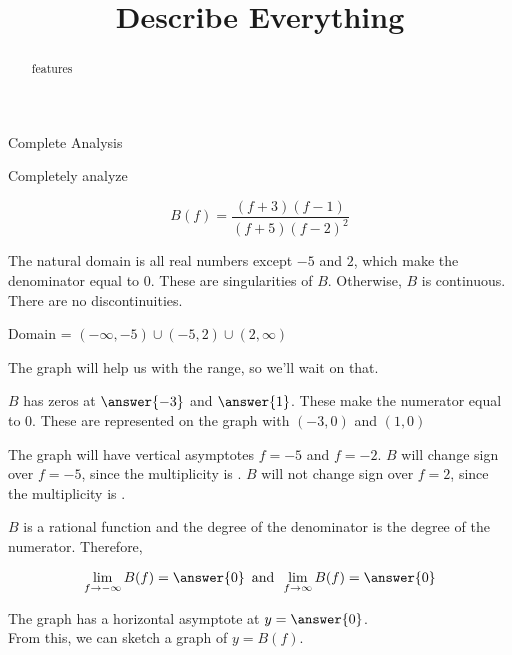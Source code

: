 \documentclass{ximera}
\title{Describe Everything}
\begin{document}
\begin{abstract}
features
\end{abstract}
\maketitle





\begin{example}  Complete Analysis


Completely analyze   

\[   B(f) = \frac{(f+3)(f-1)}{(f+5)(f-2)^2}        \]


\begin{explanation}



The natural domain is all real numbers except $-5$ and $2$, which make the denominator equal to $0$. These are singularities of $B$.  Otherwise, $B$ is continuous.  There are no discontinuities.

Domain = $(-\infty, -5) \cup (-5, 2) \cup (2, \infty)$

The graph will help us with the range, so we'll wait on that.

$B$ has zeros at $\answer{-3}$ and $\answer{1}$.  These make the numerator equal to $0$. These are represented on the graph with $(-3,0)$ and $(1,0)$

The graph will have vertical asymptotes $f=-5$ and $f=-2$.  $B$ will change sign over $f=-5$, since the multiplicity is  .  $B$ will not change sign over $f=2$, since the multiplicity is .

$B$ is a rational function and the degree of the denominator is  the degree of the numerator. Therefore, 


\[ \lim_{f \to -\infty} B(f) = \answer{0}   \, \text{ and }  \,  \lim_{f \to \infty} B(f) = \answer{0}    \]


The graph has a horizontal asymptote at $y=\answer{0}$. \\

From this, we can sketch a graph of $y = B(f)$. \\







\end{explanation}
\end{example}
\end{document}
